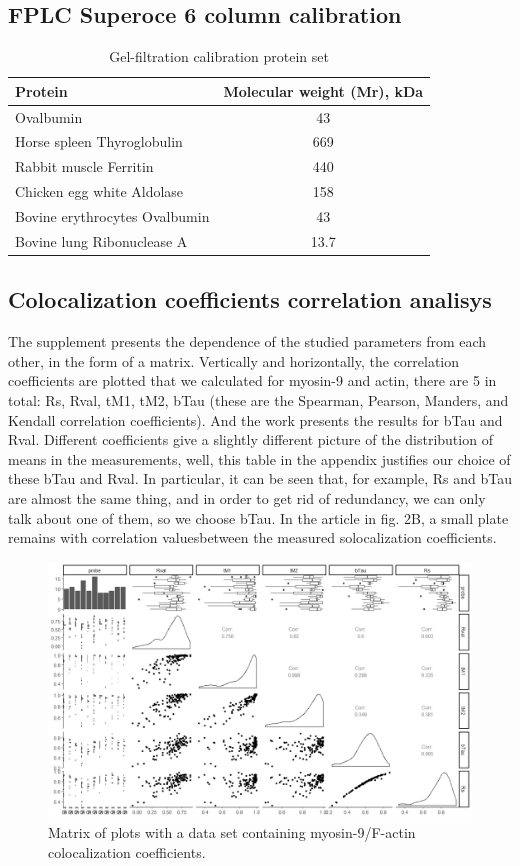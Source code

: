 \documentclass[english,authoryear]{elsarticle}
\begin{document}
\subsection*{FPLC Superoce 6 column calibration}

\begin{table}[h]
  \caption{Gel-filtration calibration protein set}
  \label{calibration}
\centering
\begin{tabular}{l|c|}
 Protein & Molecular weight (Mr), kDa  \\
 \hline
 Ovalbumin & 43 \\
 Horse spleen Thyroglobulin & 669 \\
 Rabbit muscle Ferritin & 440 \\
 Chicken egg white Aldolase & 158 \\
 Bovine erythrocytes Ovalbumin & 43 \\
 Bovine lung Ribonuclease A & 13.7
\end{tabular}
\end{table}

\subsection*{Colocalization coefficients correlation analisys}

The supplement presents the dependence of the studied parameters from each other, in the form of a matrix.
Vertically and horizontally, the correlation coefficients are plotted that we calculated for myosin-9 and actin, there are 5 in total: Rs, Rval, tM1, tM2, bTau (these are the Spearman, Pearson, Manders, and Kendall correlation coefficients). And the work presents the results for bTau and Rval. Different coefficients give a slightly different picture of the distribution of means in the measurements, well, this table in the appendix justifies our choice of these bTau and Rval. In particular, it can be seen that, for example, Rs and bTau are almost the same thing, and in order to get rid of redundancy, we can only talk about one of them, so we choose bTau. In the article in fig. 2B, a small plate remains with correlation values ​​between the measured solocalization coefficients.

\begin{figure}[h]
  \includegraphics[width=1\linewidth]{supp1.jpeg}
  \caption{Matrix of plots with a data set containing myosin-9/F-actin colocalization coefficients.}
  \label{supp1}
  \centering
\end{figure}
\end{document}
